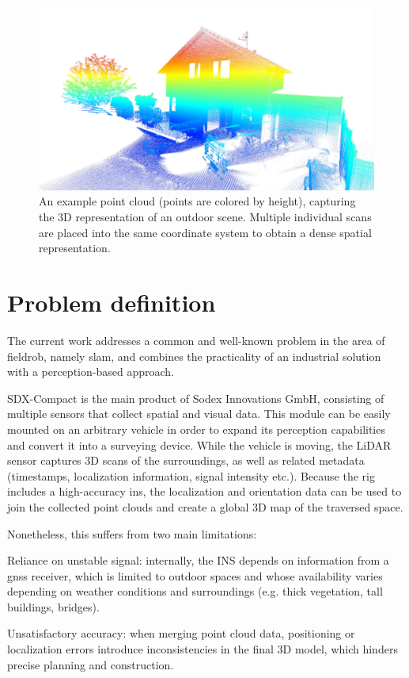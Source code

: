 \begin{figure}[H]
    \centering
    \includegraphics[width=0.7\linewidth]{images/pointcloud_example.jpeg}
    \caption[Point Cloud Example]{An example point cloud (points are colored by height), capturing the 3D representation of an outdoor scene. Multiple individual scans are placed into the same coordinate system to obtain a dense spatial representation.}
    \label{fig:pcd-example}
\end{figure}

\section{Problem definition}

The current work addresses a common and well-known problem in the area of \gls{fieldrob}, namely \acrfull{slam}, and combines the practicality of an industrial solution with a perception-based approach.

SDX-Compact  is the main product of Sodex Innovations GmbH, consisting of multiple sensors that collect spatial and visual data. This module can be easily mounted on an arbitrary vehicle in order to expand its perception capabilities and convert it into a \gls{surveying} device. While the vehicle is moving, the LiDAR sensor captures 3D scans of the surroundings, as well as related metadata (timestamps, localization information, signal intensity etc.). Because the rig includes a high-accuracy \acrfull{ins}, the localization and orientation data can be used to join the collected point clouds and create a global 3D map of the traversed space.

Nonetheless, this suffers from two main limitations:

\begin{compactitem}
    \item Reliance on unstable signal: internally, the INS depends on information from a \acrfull{gnss} receiver, which is limited to outdoor spaces and whose availability varies depending on weather conditions and surroundings (e.g. thick vegetation, tall buildings, bridges).
    \item Unsatisfactory accuracy: when merging point cloud data, positioning or localization errors introduce inconsistencies in the final 3D model, which hinders precise planning and construction.
\end{compactitem}


